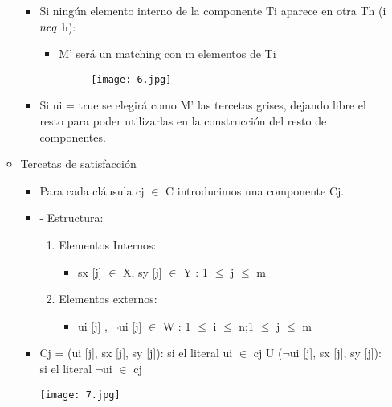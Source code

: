 \documentclass[a4paper,10pt]{article}
\begin{document}
\begin{itemize}
\begin{itemize}
\begin{itemize}
							\item Si ningún elemento interno de la componente Ti aparece en otra Th (i $\\neq$ h):  
							\begin{itemize}
										\item M' será un matching con m elementos de Ti 
										\begin{figure}[h!]
											\texttt{[image: 6.jpg]}
										\end{figure}
							\end{itemize}
							\item Si ui = true se elegirá como M' las tercetas grises, dejando libre el resto para poder utilizarlas en la construcción del resto de componentes.
						\end{itemize}
					\item Tercetas de satisfacción
						\begin{itemize}
							\item Para cada cláusula cj $\in$ C introducimos una componente Cj.
							\item -	Estructura:
								\begin{enumerate}
									\item Elementos Internos: 
										\begin{itemize}
											\item sx [j] $\in$ X, sy [j] $\in$ Y : 1 $\leq$ j $\leq$ m 																\end{itemize}
									\item Elementos externos: 
										\begin{itemize}
											\item ui [j] , $\neg$ui [j] $\in$ W : 1 $\leq$ i $\leq$ n;1 $\leq$ j $\leq$ m						\end{itemize}
								\end{enumerate}
							\item Cj = {(ui [j], sx [j], sy [j]): si el literal ui $\in$ cj} U {($\neg$ui [j], sx [j], sy [j]): si el literal $\neg$ui $\in$ cj}
							
								\texttt{[image: 7.jpg]}
							

\end{itemize}
\end{itemize}
\end{itemize}
\end{document}

